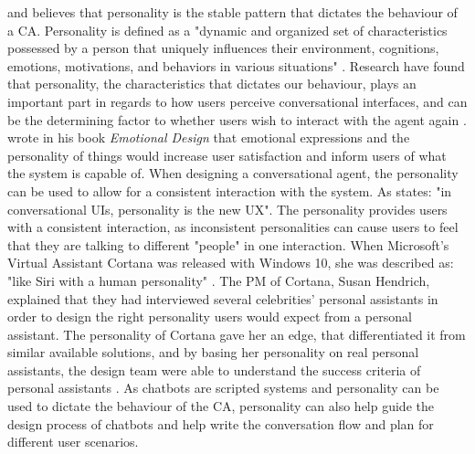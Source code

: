 \cite{callejas2011} and \cite{Xiao2005} believes that personality is the stable pattern that dictates the behaviour of a CA. Personality is defined as a "dynamic and organized set of characteristics possessed by a person that uniquely influences their environment, cognitions, emotions, motivations, and behaviors in various situations" \citep{McTear2016b}. Research have found that personality, the characteristics that dictates our behaviour, plays an important part in regards to how users perceive conversational interfaces, and can be the determining factor to whether users wish to interact with the agent again \citep{callejas2011}. \cite{Norman2007} wrote in his book \textit{Emotional Design} that emotional expressions and the personality of things would increase user satisfaction and inform users of what the system is capable of. When designing a conversational agent, the personality can be used to allow for a consistent interaction with the system. As \cite{pavlus2016} states: "in conversational UIs, personality is the new UX". The personality provides users with a consistent interaction, as inconsistent personalities can cause users to feel that they are talking to different "people" in one interaction. When Microsoft's Virtual Assistant Cortana was released with Windows 10, she was described as: "like Siri with a human personality" \citep{beres2015}. The PM of Cortana, Susan Hendrich, explained that they had interviewed several celebrities' personal assistants in order to design the right personality users would expect from a personal assistant. The personality of Cortana gave her an edge, that differentiated it from similar available solutions, and by basing her personality on real personal assistants, the design team were able to understand the success criteria of personal assistants \citep{hendrich2017}. As chatbots are scripted systems and personality can be used to dictate the behaviour of the CA, personality can also help guide the design process of chatbots and help write the conversation flow and plan for different user scenarios.

